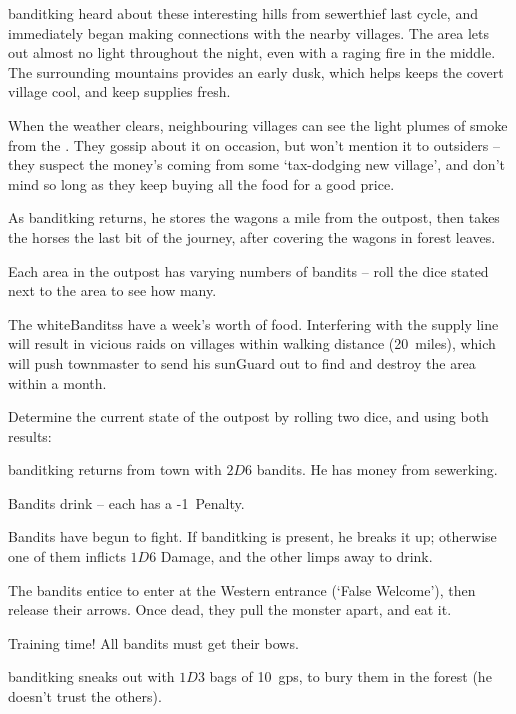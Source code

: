 \begin{multicols}{2}

\begin{exampletext}
  \noindent
  \Gls{banditking} heard about these interesting hills from \gls{sewerthief} last \gls{cycle}, and immediately began making connections with the nearby \glspl{village}.
  The area lets out almost no light throughout the night, even with a raging fire in the middle.
  The surrounding mountains provides an early dusk, which helps keeps the covert \gls{village} cool, and keep supplies fresh.
\end{exampletext}

When the weather clears, neighbouring \glspl{village} can see the light plumes of smoke from the .
They gossip about it on occasion, but won't mention it to outsiders -- they suspect the money's coming from some `tax-dodging new \gls{village}', and don't mind so long as they keep buying all the food for a good price.

As \gls{banditking} returns, he stores the wagons a mile from the outpost, then takes the horses the last bit of the journey, after covering the wagons in forest leaves.

Each area in the outpost has varying numbers of bandits -- roll the dice stated next to the area to see how many.

The \glspl{whiteBandits} have a week's worth of food.
Interfering with the supply line will result in vicious raids on \glspl{village} within walking distance (20~miles), which will push \gls{townmaster} to send his \gls{sunGuard} out to find and destroy the area within a month.


Determine the current state of the outpost by rolling two dice, and using both results:

\begin{dlist}
  \item
  \Gls{banditking} returns from \gls{town} with $2D6$ bandits.
  He has money from \gls{sewerking}.
  \item
  Bandits drink -- each has a -1~Penalty.
  \item
  Bandits have begun to fight.
  If \gls{banditking} is present, he breaks it up; otherwise one of them inflicts $1D6$ Damage, and the other limps away to drink.
  \item
  The bandits entice  to enter at the Western entrance (`False Welcome'), then release their arrows.
  Once dead, they pull the \gls{monster} apart, and eat it.
  \item
  Training time!
  All bandits must get their \glspl{bow}.
  \item
  \Gls{banditking} sneaks out with $1D3$ bags of 10~\glspl{gp}, to bury them in the forest (he doesn't trust the others).
\end{dlist}

\end{multicols}

